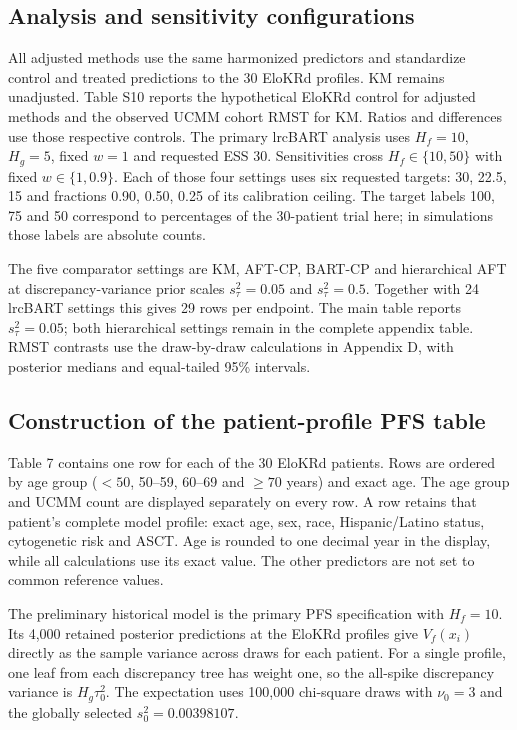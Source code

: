 \subsection{Analysis and sensitivity configurations}\label{sec:F.2}
All adjusted methods use the same harmonized predictors and standardize control and treated predictions to the 30 EloKRd profiles. KM remains unadjusted. Table S10 reports the hypothetical EloKRd control for adjusted methods and the observed UCMM cohort RMST for KM. Ratios and differences use those respective controls. The primary lrcBART analysis uses $H_f=10$, $H_g=5$, fixed $w=1$ and requested ESS 30. Sensitivities cross $H_f\in\{10,50\}$ with fixed $w\in\{1,0.9\}$. Each of those four settings uses six requested targets: 30, 22.5, 15 and fractions 0.90, 0.50, 0.25 of its calibration ceiling. The target labels 100, 75 and 50 correspond to percentages of the 30-patient trial here; in simulations those labels are absolute counts.

The five comparator settings are KM, AFT-CP, BART-CP and hierarchical AFT at discrepancy-variance prior scales $s_\tau^2=0.05$ and $s_\tau^2=0.5$. Together with 24 lrcBART settings this gives 29 rows per endpoint. The main table reports $s_\tau^2=0.05$; both hierarchical settings remain in the complete appendix table. RMST contrasts use the draw-by-draw calculations in Appendix D, with posterior medians and equal-tailed 95\% intervals.


\clearpage

\subsection{Construction of the patient-profile PFS table}\label{sec:F.3}
Table 7 contains one row for each of the 30 EloKRd patients. Rows are ordered by age group ($<50$, 50--59, 60--69 and $\geq70$ years) and exact age. The age group and UCMM count are displayed separately on every row. A row retains that patient's complete model profile: exact age, sex, race, Hispanic/Latino status, cytogenetic risk and ASCT. Age is rounded to one decimal year in the display, while all calculations use its exact value. The other predictors are not set to common reference values.

The preliminary historical model is the primary PFS specification with $H_f=10$. Its 4,000 retained posterior predictions at the EloKRd profiles give $V_f(x_i)$ directly as the sample variance across draws for each patient. For a single profile, one leaf from each discrepancy tree has weight one, so the all-spike discrepancy variance is $H_g\tau_0^2$. The expectation uses 100,000 chi-square draws with $\nu_0=3$ and the globally selected $s_0^2=0.00398107$.


